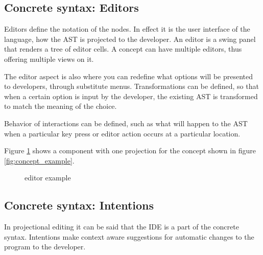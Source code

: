 \subsection{Concrete syntax: Editors}
Editors define the notation of the nodes.
In effect it is the user interface of the language, how the AST is projected to the developer.
An editor is a swing panel that renders a tree of editor cells.
A concept can have multiple editors, thus offering multiple views on it.

The editor aspect is also where you can redefine what options will be presented to developers, through substitute menus.
Transformations can be defined, so that when a certain option is input by the developer, the existing AST is transformed to match the meaning of the choice.

Behavior of interactions can be defined, such as what will happen to the AST when a particular key press or editor action occurs at a particular location.

Figure \ref{fig:editor_example} shows a component with one projection for the concept shown in figure \ref{fig:concept_example}.
\begin{figure}[h]
    \centering
    \caption{editor example}
    \label{fig:editor_example}
\end{figure}
 

\subsection{Concrete syntax: Intentions}
In projectional editing it can be said that the IDE is a part of the concrete syntax.
Intentions make context aware suggestions for automatic changes to the program to the developer.

